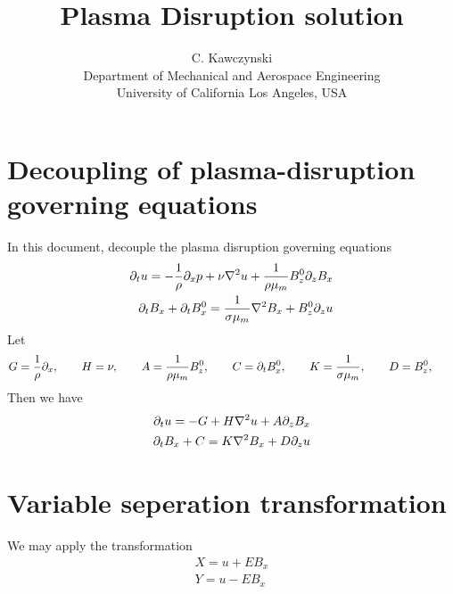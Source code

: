 \documentclass[11pt]{article}
\begin{document}
\doublespacing
\title{Plasma Disruption solution}
\author{C. Kawczynski \\
Department of Mechanical and Aerospace Engineering \\
University of California Los Angeles, USA\\
}
\maketitle

\section{Decoupling of plasma-disruption governing equations}
In this document, decouple the plasma disruption governing equations
\begin{equation}\begin{aligned}
\partial_t u                 = -\frac{1}{\rho}\partial_x p+ \nu \nabla^2 u + \frac{1}{\rho {\mu_m}} B_z^0 \partial_z B_x \\
\partial_t B_x + \partial_t B_x^0 = \frac{1}{\sigma {\mu_m}} \nabla^2 B_x + B_z^0 \partial_z u \\
\end{aligned} \end{equation}
Let
\begin{equation}\begin{aligned}
G = \frac{1}{\rho}\partial_x, \qquad
H = \nu, \qquad
A = \frac{1}{\rho {\mu_m}} B_z^0, \qquad
C = \partial_t B_x^0, \qquad
K = \frac{1}{\sigma {\mu_m}}, \qquad
D = B_z^0, \qquad
\end{aligned} \end{equation}
Then we have
\begin{equation}\begin{aligned}
\partial_t u                 = -G+ H \nabla^2 u + A \partial_z B_x \\
\partial_t B_x + C = K \nabla^2 B_x + D \partial_z u \\
\end{aligned} \end{equation}

\section{Variable seperation transformation}
We may apply the transformation
\begin{equation}\begin{aligned}
X = u + E B_x \\
Y = u - E B_x \\
\end{aligned} \end{equation}
\end{document}
